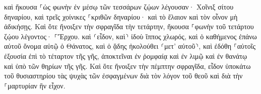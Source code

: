 \documentclass{openreader}
\begin{document}
καὶ ἤκουσα ⸀ὡς φωνὴν ἐν μέσῳ τῶν τεσσάρων ζῴων λέγουσαν· Χοῖνιξ σίτου δηναρίου, καὶ τρεῖς χοίνικες ⸀κριθῶν δηναρίου· καὶ τὸ ἔλαιον καὶ τὸν οἶνον μὴ ἀδικήσῃς. 
Καὶ ὅτε ἤνοιξεν τὴν σφραγῖδα τὴν τετάρτην, ἤκουσα ⸀φωνὴν τοῦ τετάρτου ζῴου λέγοντος· ⸀Ἔρχου. 
καὶ ⸂εἶδον, καὶ⸃ ἰδοὺ ἵππος χλωρός, καὶ ὁ καθήμενος ἐπάνω αὐτοῦ ὄνομα αὐτῷ ὁ Θάνατος, καὶ ὁ ᾅδης ἠκολούθει ⸂μετ’ αὐτοῦ⸃, καὶ ἐδόθη ⸀αὐτοῖς ἐξουσία ἐπὶ τὸ τέταρτον τῆς γῆς, ἀποκτεῖναι ἐν ῥομφαίᾳ καὶ ἐν λιμῷ καὶ ἐν θανάτῳ καὶ ὑπὸ τῶν θηρίων τῆς γῆς. 
Καὶ ὅτε ἤνοιξεν τὴν πέμπτην σφραγῖδα, εἶδον ὑποκάτω τοῦ θυσιαστηρίου τὰς ψυχὰς τῶν ἐσφαγμένων διὰ τὸν λόγον τοῦ θεοῦ καὶ διὰ τὴν ⸀μαρτυρίαν ἣν εἶχον. 
\end{document}

